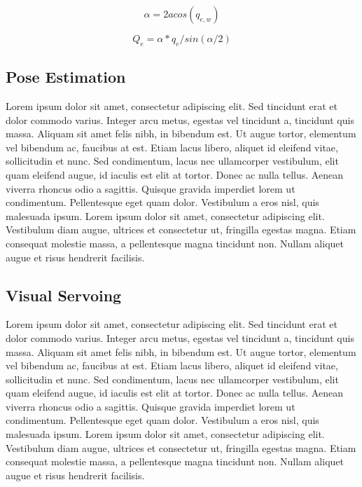 \documentclass[letterpaper, 10 pt, conference]{ieeeconf}
\begin{document}
\begin{equation}
\label{quat_angle}
\alpha = 2acos(q_{e,w})
\end{equation}

\begin{equation}
\label{quat_linearize}
Q_e = \alpha*q_e/sin(\alpha /2)
\end{equation}

\subsection{Pose Estimation}
Lorem ipsum dolor sit amet, consectetur adipiscing elit. Sed tincidunt erat et dolor commodo varius. Integer arcu metus, egestas vel tincidunt a, tincidunt quis massa. Aliquam sit amet felis nibh, in bibendum est. Ut augue tortor, elementum vel bibendum ac, faucibus at est. Etiam lacus libero, aliquet id eleifend vitae, sollicitudin et nunc. Sed condimentum, lacus nec ullamcorper vestibulum, elit quam eleifend augue, id iaculis est elit at tortor. Donec ac nulla tellus. Aenean viverra rhoncus odio a sagittis. Quisque gravida imperdiet lorem ut condimentum. Pellentesque eget quam dolor. Vestibulum a eros nisl, quis malesuada ipsum. Lorem ipsum dolor sit amet, consectetur adipiscing elit. Vestibulum diam augue, ultrices et consectetur ut, fringilla egestas magna. Etiam consequat molestie massa, a pellentesque magna tincidunt non. Nullam aliquet augue et risus hendrerit facilisis.

\subsection{Visual Servoing}
Lorem ipsum dolor sit amet, consectetur adipiscing elit. Sed tincidunt erat et dolor commodo varius. Integer arcu metus, egestas vel tincidunt a, tincidunt quis massa. Aliquam sit amet felis nibh, in bibendum est. Ut augue tortor, elementum vel bibendum ac, faucibus at est. Etiam lacus libero, aliquet id eleifend vitae, sollicitudin et nunc. Sed condimentum, lacus nec ullamcorper vestibulum, elit quam eleifend augue, id iaculis est elit at tortor. Donec ac nulla tellus. Aenean viverra rhoncus odio a sagittis. Quisque gravida imperdiet lorem ut condimentum. Pellentesque eget quam dolor. Vestibulum a eros nisl, quis malesuada ipsum. Lorem ipsum dolor sit amet, consectetur adipiscing elit. Vestibulum diam augue, ultrices et consectetur ut, fringilla egestas magna. Etiam consequat molestie massa, a pellentesque magna tincidunt non. Nullam aliquet augue et risus hendrerit facilisis.
\end{document}

